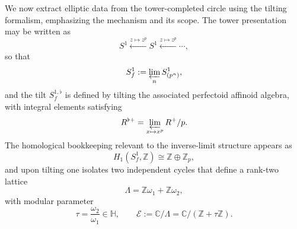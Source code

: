 \documentclass[11pt]{article}
\theoremstyle{remark}
\newcommand{\Z}{\mathbb{Z}}
\begin{document}
We now extract elliptic data from the tower-completed circle using the tilting formalism, emphasizing the mechanism and its scope. The tower presentation may be written as
\begin{equation}\label{91}
S^{1}\xleftarrow{z\mapsto z^{p}}S^{1}\xleftarrow{z\mapsto z^{p}}\cdots,
\end{equation}
so that
\begin{equation}\label{92}
S_f^{1}:=\varprojlim_{n}S^{1}_{(p^{n})},
\end{equation}
and the tilt \(S_f^{1,\flat}\) is defined by tilting the associated perfectoid affinoid algebra, with integral elements satisfying
\begin{equation}\label{93}
R^{\flat+}=\varprojlim_{x\mapsto x^{p}}R^{+}/p.
\end{equation}
The homological bookkeeping relevant to the inverse-limit structure appears as
\begin{equation}\label{94}
H_1(S_f^{1},\Z)\cong \Z\oplus \Z_p,
\end{equation}
and upon tilting one isolates two independent cycles that define a rank-two lattice
\begin{equation}\label{95}
\Lambda=\Z\omega_{1}+\Z\omega_{2},
\end{equation}
with modular parameter
\begin{equation}\label{96}
\tau=\frac{\omega_{2}}{\omega_{1}} \in \mathbb{H},
\qquad
\mathcal{E} := \mathbb{C}/\Lambda = \mathbb{C}/(\mathbb{Z} + \tau \mathbb{Z}).
\end{equation}
\end{document}
